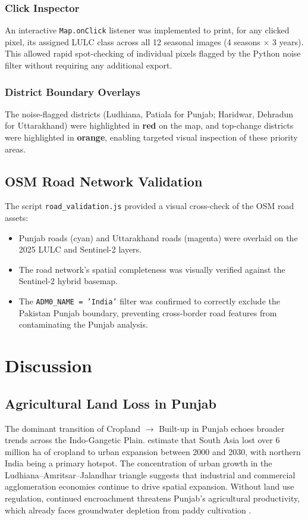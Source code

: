\documentclass[12pt,a4paper]{article}
\begin{document}
\subsubsection{Click Inspector}
An interactive \texttt{Map.onClick} listener was implemented to print, for any clicked pixel, its assigned LULC class across all 12 seasonal images (4 seasons $\times$ 3 years). This allowed rapid spot-checking of individual pixels flagged by the Python noise filter without requiring any additional export.

\subsubsection{District Boundary Overlays}
The noise-flagged districts (Ludhiana, Patiala for Punjab; Haridwar, Dehradun for Uttarakhand) were highlighted in \textbf{red} on the map, and top-change districts were highlighted in \textbf{orange}, enabling targeted visual inspection of these priority areas.

\subsection{OSM Road Network Validation}

The script \texttt{road\_validation.js} provided a visual cross-check of the OSM road assets:
\begin{itemize}
    \item Punjab roads (cyan) and Uttarakhand roads (magenta) were overlaid on the 2025 LULC and Sentinel-2 layers.
    \item The road network's spatial completeness was visually verified against the Sentinel-2 hybrid basemap.
    \item The \texttt{ADM0\_NAME = 'India'} filter was confirmed to correctly exclude the Pakistan Punjab boundary, preventing cross-border road features from contaminating the Punjab analysis.
\end{itemize}

\section{Discussion}

\subsection{Agricultural Land Loss in Punjab}
The dominant transition of Cropland $\to$ Built-up in Punjab echoes broader trends across the Indo-Gangetic Plain. \citet{bren2021food} estimate that South Asia lost over 6 million ha of cropland to urban expansion between 2000 and 2030, with northern India being a primary hotspot. The concentration of urban growth in the Ludhiana--Amritsar--Jalandhar triangle suggests that industrial and commercial agglomeration economies continue to drive spatial expansion. Without land use regulation, continued encroachment threatens Punjab's agricultural productivity, which already faces groundwater depletion from paddy cultivation \citep{rodell2009groundwater}.
\end{document}
